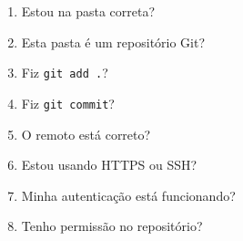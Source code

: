 \documentclass[11pt,a4paper]{article}
\begin{document}
\begin{tcolorbox}[title={CHECKLIST FINAL ANTES DO PUSH}]
\begin{enumerate}
\item Estou na pasta correta?
\item Esta pasta é um repositório Git?
\item Fiz \texttt{git add .}?
\item Fiz \texttt{git commit}?
\item O remoto está correto?
\item Estou usando HTTPS ou SSH?
\item Minha autenticação está funcionando?
\item Tenho permissão no repositório?
\end{enumerate}
\end{tcolorbox}
\end{document}
